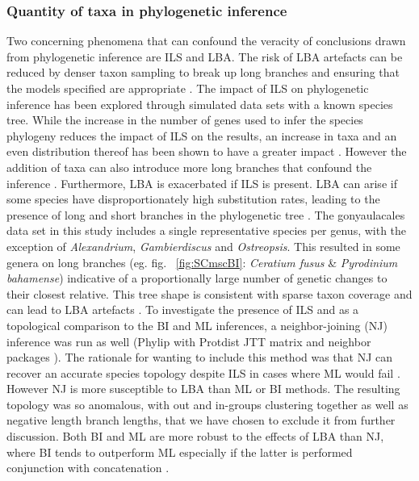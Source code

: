 \documentclass[fleqn,10pt,lineno]{wlpeerj} %
\begin{document}
\subsubsection*{Quantity of taxa in phylogenetic inference}
Two concerning phenomena that can confound the veracity of conclusions drawn from phylogenetic inference are ILS and LBA. 
The risk of LBA artefacts can be reduced by denser taxon sampling to break up long branches and ensuring that the models specified are appropriate \cite{heath2008taxon}. 
The impact of ILS on phylogenetic inference has been explored through simulated data sets with a known species tree. 
While the increase in the number of genes used to infer the species phylogeny reduces the impact of ILS on the results, an increase in taxa and an even distribution thereof has been shown to have a greater impact \cite{maddison2006inferring}.
However the addition of taxa can also introduce more long branches that confound the inference \cite{heath2008taxon}. 
Furthermore, LBA is exacerbated if ILS is present. %
LBA can arise if some species have disproportionately high substitution rates, leading to the presence of long and short branches in the phylogenetic tree \cite{liu2014coalescent}. %
The gonyaulacales data set in this study includes a single representative species per genus, with the exception of \textit{Alexandrium}, \textit{Gambierdiscus} and \textit{Ostreopsis}. 
This resulted in some genera on long branches (eg. fig. ~\ref{fig:SCmscBI}: \textit{Ceratium fusus} \& \textit{Pyrodinium bahamense}) indicative of a proportionally large number of genetic changes to their closest relative.
This tree shape is consistent with sparse taxon coverage and can lead to LBA artefacts \cite{heath2008taxon}. 
To investigate the presence of ILS and as a topological comparison to the BI and ML inferences, a neighbor-joining (NJ) inference was run as well (Phylip with Protdist JTT matrix and neighbor packages \cite{felsenstein2005phylip}). 
The rationale for wanting to include this method was that NJ can recover an accurate species topology despite ILS in cases where ML would fail  \cite{mendes2017concatenation}.
However NJ is more susceptible to LBA than ML or BI methods. 
The resulting topology was so anomalous, with out and in-groups clustering together as well as negative length branch lengths, that we have chosen to exclude it from further discussion. 
Both BI and ML are more robust to the effects of LBA than NJ, where BI tends to outperform ML especially if the latter is performed conjunction with concatenation \cite{kubatko2007inconsistency,roch2015likelihood}. 
\end{document}
